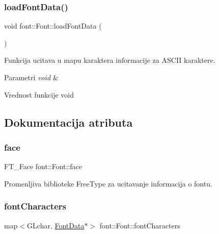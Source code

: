 \subsubsection{\texorpdfstring{load\+Font\+Data()}{loadFontData()}}
{\footnotesize\ttfamily void font\+::\+Font\+::load\+Font\+Data (\begin{DoxyParamCaption}{ }\end{DoxyParamCaption})\hspace{0.3cm}{\ttfamily [private]}}



Funkcija ucitava u mapu karaktera informacije za A\+S\+C\+II karaktere. 


\begin{DoxyParams}{Parametri}
{\em void} & \\
\hline
\end{DoxyParams}
\begin{DoxyReturn}{Vrednost funkcije}
void 
\end{DoxyReturn}


\subsection{Dokumentacija atributa}
\mbox{\label{classfont_1_1Font_a1217a07286461eceda8467479619ec2e}} 
\subsubsection{\texorpdfstring{face}{face}}
{\footnotesize\ttfamily F\+T\+\_\+\+Face font\+::\+Font\+::face\hspace{0.3cm}{\ttfamily [private]}}



Promenljiva biblioteke Free\+Type za ucitavanje informacija o fontu. 

\mbox{\label{classfont_1_1Font_a8c7aa4a1fef0409f481b7bda30b1269e}} 
\subsubsection{\texorpdfstring{font\+Characters}{fontCharacters}}
{\footnotesize\ttfamily map$<$G\+Lchar, \hyperlink{classfont_1_1FontData}{Font\+Data}$\ast$$>$ font\+::\+Font\+::font\+Characters\hspace{0.3cm}{\ttfamily [private]}}



